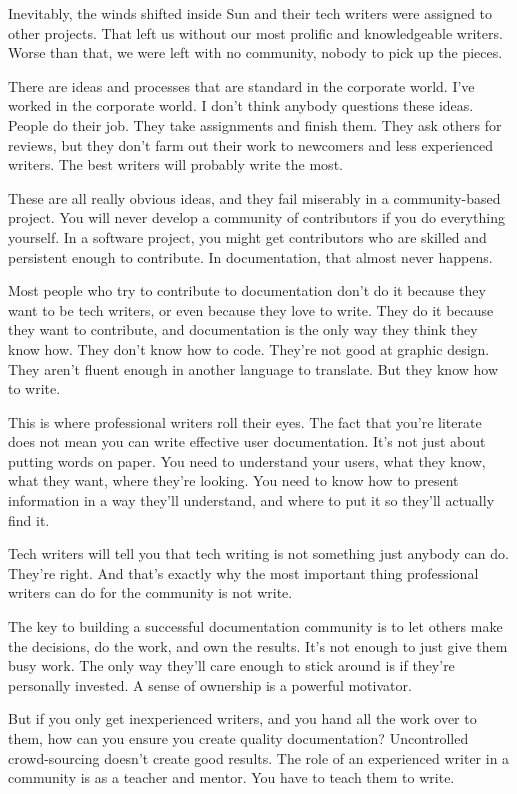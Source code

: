 Inevitably, the winds shifted inside Sun and their tech writers were
assigned to other projects. That left us without our most prolific
and knowledgeable writers. Worse than that, we were left with no
community, nobody to pick up the pieces.

There are ideas and processes that are standard in the corporate world.
I've worked in the corporate world. I don't think anybody questions
these ideas. People do their job. They take assignments and finish them.
They ask others for reviews, but they don't farm out their work to
newcomers and less experienced writers. The best writers will probably
write the most.

These are all really obvious ideas, and they fail miserably in a community-based
project. You will never develop a community of contributors if you do everything
yourself. In a software project, you might get contributors who are skilled and
persistent enough to contribute. In documentation, that almost never happens.

Most people who try to contribute to documentation don't do it because they
want to be tech writers, or even because they love to write. They do it
because they want to contribute, and documentation is the only way they
think they know how. They don't know how to code. They're not good at
graphic design. They aren't fluent enough in another language to translate.
But they know how to write.

This is where professional writers roll their eyes. The fact that you're
literate does not mean you can write effective user documentation. It's
not just about putting words on paper. You need to understand your users,
what they know, what they want, where they're looking. You need to know
how to present information in a way they'll understand, and where to put
it so they'll actually find it.

Tech writers will tell you that tech writing is not something just anybody
can do. They're right. And that's exactly why the most important thing
professional writers can do for the community is not write.

The key to building a successful documentation community is to let others
make the decisions, do the work, and own the results. It's not enough to
just give them busy work. The only way they'll care enough to stick around
is if they're personally invested. A sense of ownership is a powerful
motivator.

But if you only get inexperienced writers, and you hand all the work
over to them, how can you ensure you create quality documentation?
Uncontrolled crowd-sourcing doesn't create good results. The role
of an experienced writer in a community is as a teacher and mentor.
You have to teach them to write.

